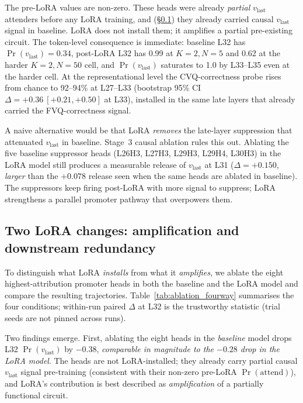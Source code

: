 The pre-LoRA values are non-zero. These heads were already
\emph{partial} $v_{\text{last}}$ attenders before any LoRA training,
and (\S\ref{sec:mechanism:causal}) they already carried causal
$v_{\text{last}}$ signal in baseline. LoRA does not install them;
it amplifies a partial pre-existing circuit. The token-level
consequence is immediate: baseline L32 has
$\Pr(v_{\text{last}}){=}0.34$, post-LoRA L32 has 0.99 at
$K{=}2, N{=}5$ and 0.62 at the harder $K{=}2, N{=}50$ cell, and
$\Pr(v_{\text{last}})$ saturates to 1.0 by L33--L35 even at the
harder cell. At the representational level the CVQ-correctness probe
rises from chance to 92--94\% at L27--L33 (bootstrap 95\% CI
$\Delta {=} +0.36~[+0.21, +0.50]$ at L33), installed in the same
late layers that already carried the FVQ-correctness signal.

A naive alternative would be that LoRA \emph{removes} the late-layer
suppression that attenuated $v_{\text{last}}$ in baseline. Stage~3
causal ablation rules this out. Ablating the five baseline suppressor
heads (L26H3, L27H3, L29H3, L29H4, L30H3) in the LoRA model still
produces a measurable release of $v_{\text{last}}$ at L31
($\Delta{=}{+}0.150$, \emph{larger} than the $+0.078$ release seen
when the same heads are ablated in baseline). The suppressors keep
firing post-LoRA with more signal to suppress; LoRA strengthens a
parallel promoter pathway that overpowers them.

\subsection{Two LoRA changes: amplification and downstream
redundancy}
\label{sec:mechanism:causal}

To distinguish what LoRA \emph{installs} from what it \emph{amplifies}, we
ablate the eight highest-attribution promoter heads in both the
baseline and the LoRA model and compare the resulting trajectories.
Table~\ref{tab:ablation_fourway} summarises the four conditions;
within-run paired $\Delta$ at L32 is the trustworthy statistic
(trial seeds are not pinned across runs).

Two findings emerge. First, ablating the eight heads in the
\emph{baseline} model drops L32 $\Pr(v_{\text{last}})$ by $-0.38$,
\emph{comparable in magnitude to the $-0.28$ drop in the LoRA model}.
The heads are not LoRA-installed; they already carry partial causal
$v_{\text{last}}$ signal pre-training (consistent with their non-zero
pre-LoRA $\Pr(\text{attend})$), and LoRA's contribution is best
described as \emph{amplification} of a partially functional circuit.

